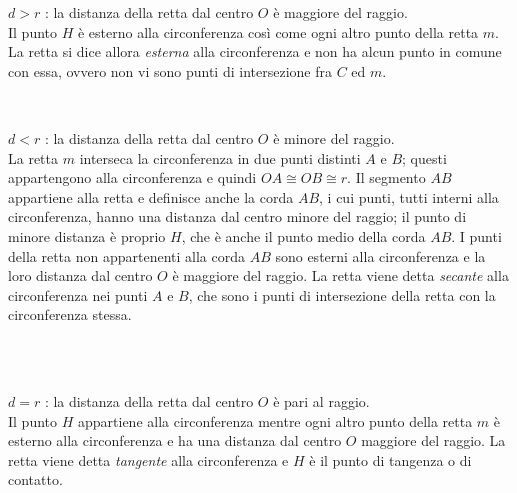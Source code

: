 \begin{enumeratea}

\noindent\begin{minipage}{0.6\textwidth}\parindent15pt
\item \(d > r\) : la distanza della retta dal centro \(O\) è maggiore del 
raggio.\\
Il punto \(H\) è esterno alla circonferenza così come ogni altro punto 
della retta \(m\). La retta si dice allora \emph{esterna} alla 
circonferenza e non ha alcun punto in comune con essa, ovvero non vi 
sono punti di intersezione fra \(C\) ed \(m\).
\end{minipage}\hfil
\begin{minipage}{0.4\textwidth}
  \centering\\\vspace{5pt}
\end{minipage}\vspace{4pt}

\noindent\begin{minipage}{0.6\textwidth}\parindent15pt
\item \(d < r\) : la distanza della retta dal centro \(O\) è minore del 
raggio.\\
La retta \(m\) interseca la circonferenza in due punti distinti \(A\) e 
\(B\); questi appartengono alla circonferenza e quindi \(OA\cong OB\cong 
r\). Il segmento \(AB\) appartiene alla retta e definisce anche la corda 
\(AB\), i cui punti, tutti interni alla circonferenza, hanno una 
distanza dal centro minore del raggio; il punto di minore distanza è 
proprio \(H\), che è anche il punto medio della corda \(AB\). I punti 
della retta non appartenenti alla corda \(AB\) sono esterni alla 
circonferenza e la loro distanza dal centro \(O\) è maggiore del raggio.
La retta viene detta \emph{secante} alla circonferenza nei punti \(A\) 
e \(B\), che sono i punti di intersezione della retta con la 
circonferenza stessa.
\end{minipage}\hfil
\begin{minipage}{0.4\textwidth}
  \centering\\\vspace{4pt}
  \centering\\\vspace{4pt}
\end{minipage}\vspace{4pt}

\item \(d = r\) : la distanza della retta dal centro \(O\) è pari al 
raggio.\\
Il punto \(H\) appartiene alla circonferenza mentre ogni altro punto 
della retta \(m\) è esterno alla circonferenza e ha una distanza dal 
centro \(O\) maggiore del raggio. La retta viene detta \emph{tangente} 
alla circonferenza e \(H\) è il punto di tangenza o di contatto.

\end{enumeratea}

